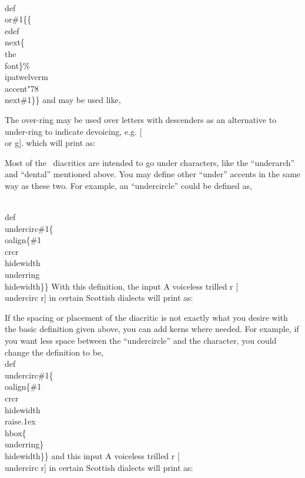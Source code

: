\asisbegin
\\def\\or\#1\{\{\\edef\\next\{\\the\\font\}\%
          \\ipatwelverm\\accent"78\\next\#1\}\}
\aie
\nin and may be used like,
 
\aib
The over-ring may be used over letters with descenders as an
alternative to under-ring to indicate devoicing, e.g. [\\or g].
\asisend
\nin which will print as:
\vs{5pt}
\vs{5pt}
 
Most of the \wsu\ diacritics are intended to go under characters, like the
``underarch'' and ``dental'' mentioned above. You may define other ``under''
accents in the same way as these two. For example, an ``undercircle''
could be defined as,
 
\asisbegin
\\def\\undercirc\#1\{\\oalign\{\#1\\crcr
                 \\hidewidth\\underring\\hidewidth\}\}
\asisend
\nin With this definition, the input
\aib
A voiceless trilled r [\\undercirc r] in
certain Scottish dialects
\aie
\nin will print as:
\vs{5pt}
\vs{5pt}
 
If the spacing or placement of the diacritic is not exactly what you desire
with the basic definition given above, you can add kerns where needed.
For example, if you want less space between the ``undercircle'' and
the character, you could change the definition to be,
\asisbegin\lin{-10pt}
\\def\\undercirc\#1\{\\oalign\{\#1\\crcr
           \\hidewidth\\raise.1ex\\hbox\{\\underring\}\\hidewidth\}\}
\asisend
\np
\nin and this input
\aib
A voiceless trilled r [\\undercirc r] in
certain Scottish dialects
\aie
\nin will print as:
\vs{5pt}
\vs{5pt}
 
